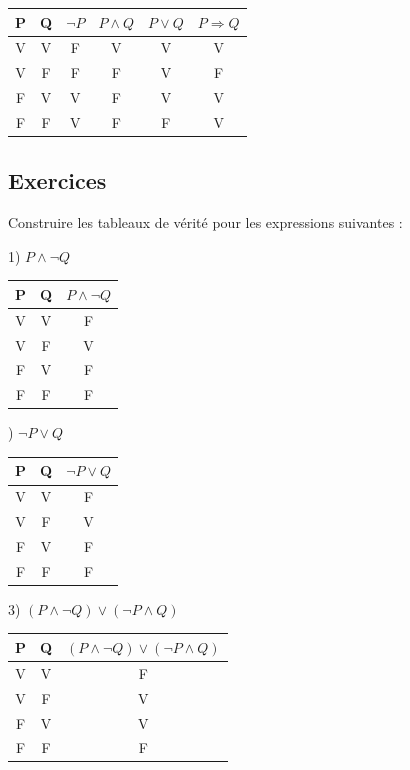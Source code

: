 \documentclass[a4paper,12pt]{article}
\begin{document}
\begin{center}
\begin{tabular}{|c|c|c|c|c|c|}
\hline
P & Q & $\neg P$ & $P \wedge Q$ & $P \vee Q$ & $P \Rightarrow Q$ \\
\hline
V & V & F & V & V & V \\ 
V & F & F & F & V & F \\ 
F & V & V & F & V & V \\ 
F & F & V & F & F & V \\ 
\hline
\end{tabular}
\end{center}

\subsection{Exercices}

Construire les tableaux de vérité pour les expressions suivantes :

1) $P \wedge \neg Q$ 
\begin{center}
\begin{tabular}{|c|c|c|}
\hline
P & Q & $P \wedge \neg Q$ \\
\hline
V & V & F \\
V & F & V \\
F & V & F \\
F & F & F \\
\hline
\end{tabular}
\end{center}

) $\neg P \vee Q$ 
\begin{center}
\begin{tabular}{|c|c|c|}
\hline
P & Q & $\neg P \vee Q$ \\
\hline
V & V & F \\
V & F & V \\
F & V & F \\
F & F & F \\
\hline
\end{tabular}
\end{center}

3) $(P \wedge \neg Q) \vee (\neg P \wedge Q)$ 
\begin{center}
\begin{tabular}{|c|c|c|}
\hline
P & Q & $(P \wedge \neg Q) \vee (\neg P \wedge Q)$ \\
\hline
V & V & F \\
V & F & V \\
F & V & V \\
F & F & F \\
\hline
\end{tabular}
\end{center}
\end{document}
